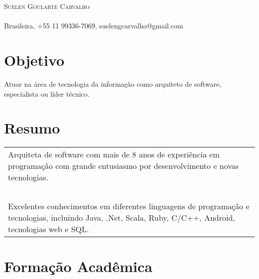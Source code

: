 \documentclass[a4paper, oneside, final]{scrartcl}
\begin{document}
\begin{center}
\textsc{\Huge{Suelen Goularte Carvalho}}\\
\ \\
Brasileira, +55 11 99336-7069, suelengcarvalho@gmail.com


\section{Objetivo}
	Atuar na área de tecnologia da informação como arquiteto de software, especialista ou líder técnico.



\section{Resumo}

\begin{tabularx}{0.97\linewidth}{X}
	Arquiteta de software com mais de 8 anos de experiência em programação com grande entusiasmo por desenvolvimento e novas tecnologias. \\ \ \\
	
	Excelentes conhecimentos em diferentes linguagens de programação e tecnologias, incluindo Java, .Net, Scala, Ruby, C/C++, Android, tecnologias web e SQL.
\end{tabularx}

\section{Formação Acadêmica}


\end{center}
\end{document}
